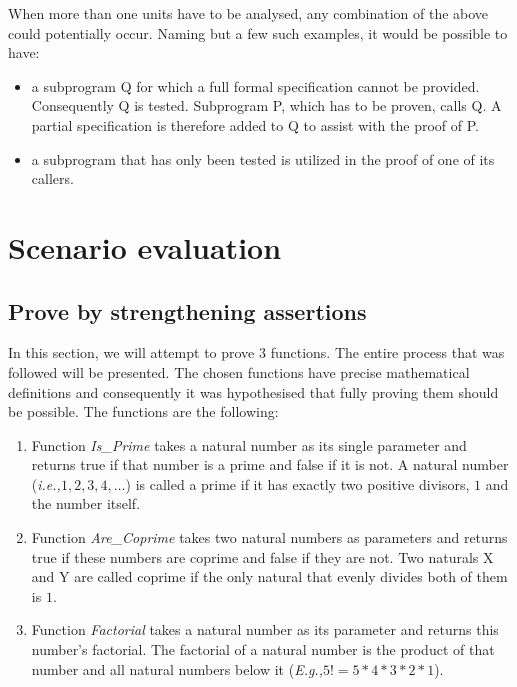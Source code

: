 \documentclass{llncs}
\newcommand{\ie}{\textit{i.e.,}\xspace}
\newcommand{\Eg}{\textit{E.g.,}\xspace}
\begin{document}
When more than one units have to be analysed, any combination of the
above could potentially occur. Naming but a few such examples, it
would be possible to have:
\begin{itemize}
\item a subprogram Q for which a full formal specification cannot be
  provided. Consequently Q is tested. Subprogram P, which has to be
  proven, calls Q. A partial specification is therefore added to Q to
  assist with the proof of P.

\item a subprogram that has only been tested is utilized in the proof
  of one of its callers.
\end{itemize}



\section{Scenario evaluation}

\subsection{Prove by strengthening assertions}
In this section, we will attempt to prove 3 functions. The entire
process that was followed will be presented. The chosen functions have
precise mathematical definitions and consequently it was hypothesised
that fully proving them should be possible. The functions are the
following:
\begin{enumerate}
\item Function \emph{Is\_Prime} takes a natural number as its single
  parameter and returns true if that number is a prime and false if it
  is not. A natural number (\ie $1, 2, 3, 4, \dots$) is called a prime
  if it has exactly two positive divisors, $1$ and the number itself.

\item Function \emph{Are\_Coprime} takes two natural numbers as
  parameters and returns true if these numbers are coprime and false
  if they are not. Two naturals X and Y are called coprime if the only
  natural that evenly divides both of them is $1$.

\item Function \emph{Factorial} takes a natural number as its
  parameter and returns this number's factorial. The factorial of a
  natural number is the product of that number and all natural numbers
  below it (\Eg $5! = 5 * 4 * 3 * 2 * 1$).
\end{enumerate}
\end{document}
